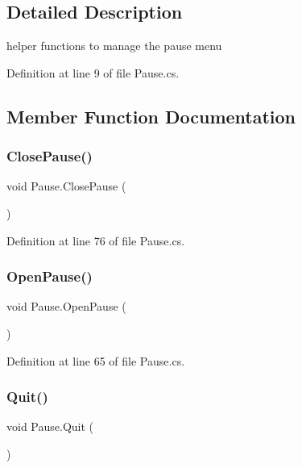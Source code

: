 \subsection{Detailed Description}
helper functions to manage the pause menu 



Definition at line 9 of file Pause.\+cs.



\subsection{Member Function Documentation}
\mbox{\label{class_pause_a63448644fd5e8810e48686afcf7e2cb0}} 
\subsubsection{\texorpdfstring{Close\+Pause()}{ClosePause()}}
{\footnotesize\ttfamily void Pause.\+Close\+Pause (\begin{DoxyParamCaption}{ }\end{DoxyParamCaption})}



Definition at line 76 of file Pause.\+cs.

\mbox{\label{class_pause_a984765e93c7262d613e53ea6cc8a4982}} 
\subsubsection{\texorpdfstring{Open\+Pause()}{OpenPause()}}
{\footnotesize\ttfamily void Pause.\+Open\+Pause (\begin{DoxyParamCaption}{ }\end{DoxyParamCaption})}



Definition at line 65 of file Pause.\+cs.

\mbox{\label{class_pause_a5371367a048d854eba46cf8e2d746776}} 
\subsubsection{\texorpdfstring{Quit()}{Quit()}}
{\footnotesize\ttfamily void Pause.\+Quit (\begin{DoxyParamCaption}{ }\end{DoxyParamCaption})}




